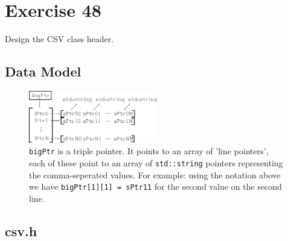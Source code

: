 \section*{Exercise 48}
\begin{question}
Design the CSV class header.
\end{question}

\begin{solution}

    \subsection*{Data Model}
    \begin{figure}[H]
        \centering
        \includegraphics[width=0.5\textwidth]{../48/images/datamodel.eps}
        \caption{\texttt{bigPtr} is a triple pointer. It points to an array of 'line pointers', each of these point to an array of \texttt{std::string} pointers representing the comma-seperated values. For example: using the notation above we have \texttt{bigPtr[1][1] = sPtr11} for the second value on the second line.}
    \end{figure}

    \subsection*{csv.h}
\end{solution}
